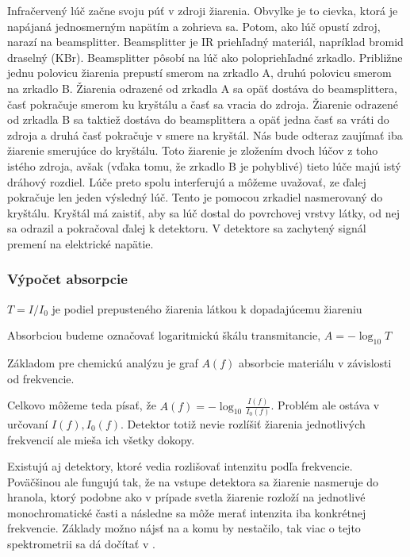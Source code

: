Infračervený lúč začne svoju púť v zdroji žiarenia. Obvylke je to 
cievka, ktorá je napájaná jednosmerným napätím a zohrieva sa.
Potom, ako lúč opustí zdroj, narazí na beamsplitter. Beamsplitter
je IR priehľadný materiál, napríklad bromid draselný (KBr). 
Beamsplitter pôsobí
na lúč ako polopriehľadné zrkadlo. Približne jednu polovicu žiarenia
prepustí smerom na zrkadlo A, druhú polovicu smerom na zrkadlo B.
Žiarenia odrazené od zrkadla A sa opäť dostáva do beamsplittera,
časť pokračuje smerom ku kryštálu a časť sa vracia do zdroja.
Žiarenie odrazené od zrkadla B sa taktiež dostáva do beamsplittera a
opäť jedna časť sa vráti do zdroja a druhá časť pokračuje v smere na
kryštál. Nás bude odteraz zaujímať iba žiarenie smerujúce do kryštálu.
Toto žiarenie je zložením dvoch lúčov z toho istého zdroja, avšak
(vďaka tomu, že zrkadlo B je pohyblivé) tieto lúče majú istý
dráhový rozdiel. Lúče preto spolu interferujú a môžeme
uvažovať, ze ďalej pokračuje len jeden výsledný lúč.
Tento je pomocou zrkadiel nasmerovaný do kryštálu. Kryštál má zaistiť,
aby sa lúč dostal do povrchovej vrstvy látky, od nej sa odrazil a
pokračoval ďalej k detektoru. V detektore sa zachytený signál
premení na elektrické napätie.


\subsubsection{Výpočet absorpcie}

\begin{definicia}[Transmitancia]
    $T=I/I_0$ je podiel prepusteného žiarenia látkou k dopadajúcemu
    žiareniu
\end{definicia}

\begin{definicia}[Absorbcia]
    Absorbciou budeme označovať logaritmickú škálu transmitancie,
    $A=-\log_{10}T$
\end{definicia}

Základom pre chemickú analýzu je graf $A(f)$ absorbcie materiálu v
závislosti od frekvencie. 

Celkovo môžeme teda písať, že $A(f) = -\log_{10} \frac{I(f)}{I_0(f)}$.
Problém ale ostáva v určovaní $I(f), I_0(f)$. Detektor totiž nevie rozlíšiť
žiarenia jednotlivých frekvencií ale mieša ich všetky dokopy.

\begin{poznamka}
    Existujú aj detektory, ktoré vedia rozlišovať intenzitu podľa
    frekvencie. Poväčšinou ale fungujú tak, že na vstupe detektora sa
    žiarenie nasmeruje do hranola, ktorý podobne ako v prípade svetla
    žiarenie rozloží na jednotlivé monochromatické časti a následne
    sa môže merať intenzita iba konkrétnej frekvencie. Základy možno
    nájsť na \cite{wiki:spectrometer} a komu by nestačilo, tak viac o tejto
    spektrometrii sa dá dočítať v \todo{}. 
\end{poznamka}



